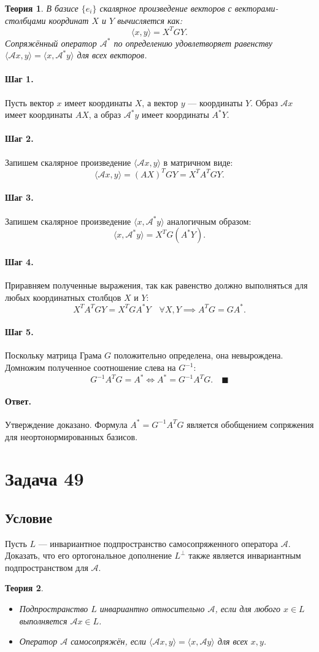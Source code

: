 \documentclass[12pt,a4paper]{article}
\theoremstyle{solution}
\newtheorem*{theory}{Теория}
\newcommand{\task}[1]{\newpage\section*{Задача #1}}
\newcommand{\answer}{\paragraph{Ответ.}}
\newcommand{\step}[1]{\paragraph{Шаг #1.}}
\begin{document}
\begin{theory}
В базисе $\{e_i\}$ скалярное произведение векторов с векторами-столбцами координат $X$ и $Y$ вычисляется как:
\[
\langle x, y\rangle = X^T G Y.
\]
Сопряжённый оператор $\mathcal{A}^*$ по определению удовлетворяет равенству $\langle \mathcal{A}x, y\rangle = \langle x, \mathcal{A}^* y\rangle$ для всех векторов.
\end{theory}

\step{1} Пусть вектор $x$ имеет координаты $X$, а вектор $y$ — координаты $Y$. Образ $\mathcal{A}x$ имеет координаты $A X$, а образ $\mathcal{A}^* y$ имеет координаты $A^* Y$.

\step{2} Запишем скалярное произведение $\langle \mathcal{A}x, y\rangle$ в матричном виде:
\[
\langle \mathcal{A}x, y\rangle = (A X)^T G Y = X^T A^T G Y.
\]

\step{3} Запишем скалярное произведение $\langle x, \mathcal{A}^* y\rangle$ аналогичным образом:
\[
\langle x, \mathcal{A}^* y\rangle = X^T G (A^* Y).
\]

\step{4} Приравняем полученные выражения, так как равенство должно выполняться для любых координатных столбцов $X$ и $Y$:
\[
X^T A^T G Y = X^T G A^* Y \quad \forall X, Y \implies A^T G = G A^*.
\]

\step{5} Поскольку матрица Грама $G$ положительно определена, она невырождена. Домножим полученное соотношение слева на $G^{-1}$:
\[
G^{-1} A^T G = A^* \iff A^* = G^{-1} A^T G. \quad\blacksquare
\]

\answer
Утверждение доказано. Формула $A^* = G^{-1} A^T G$ является обобщением сопряжения для неортонормированных базисов.

\task{49}
\subsection*{Условие}
Пусть $L$ — инвариантное подпространство самосопряженного оператора $\mathcal{A}$. Доказать, что его ортогональное дополнение $L^\perp$ также является инвариантным подпространством для $\mathcal{A}$.

\begin{theory}
\begin{itemize}
    \item Подпространство $L$ инвариантно относительно $\mathcal{A}$, если для любого $x \in L$ выполняется $\mathcal{A}x \in L$.
    \item Оператор $\mathcal{A}$ самосопряжён, если $\langle \mathcal{A}x, y\rangle = \langle x, \mathcal{A}y\rangle$ для всех $x, y$.
\end{itemize}
\end{theory}
\end{document}
